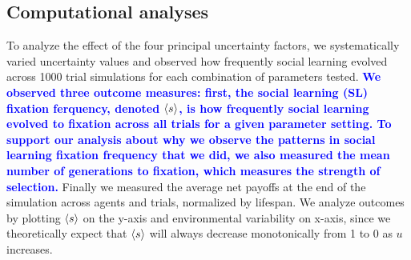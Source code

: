 \documentclass[letterpaper,11.5pt]{scrartcl}
\newcommand{\edit}[1]{{\bfseries \textcolor{blue} {#1}}}
\begin{document}
\subsection{Computational analyses}
\label{ssec:computationalAnalyses}


To analyze the effect of the four principal uncertainty factors, we systematically
varied uncertainty values %
and observed how frequently social learning evolved across 1000 trial simulations for each combination of parameters tested. %
\edit{We observed three outcome measures: first, the social learning (SL) fixation ferquency, denoted
$\langle s \rangle$, is how frequently
social learning evolved to fixation across all trials for a given parameter setting. To support our
analysis about why we observe the patterns in social learning fixation frequency that we did, we also
measured the mean number of generations to fixation, which measures the strength of selection.} Finally we
measured the average net payoffs at the end of the simulation across agents and trials, normalized by lifespan. We analyze
outcomes by plotting $\langle s \rangle$ on the y-axis and environmental variability on
x-axis, since we theoretically expect that $\langle s \rangle$ will always decrease monotonically from 1 to 0 as $u$ increases. %
\end{document}
